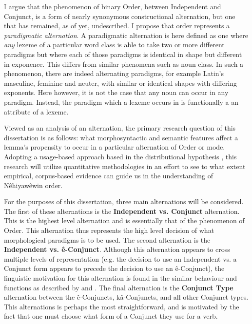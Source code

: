 I argue that the phenomenon of binary Order, between Independent and Conjunct, is a form of nearly synonymous constructional alternation, but one that has remained, as of yet, undescribed. I propose that order represents a \textit{paradigmatic alternation}. A paradigmatic alternation is here defined as one where \textit{any} lexeme of a particular word class is able to take two or more different paradigms but where each of those paradigms is identical in shape but different in exponence. This differs from similar phenomena such as noun class. In such a phenomenon, there are indeed alternating paradigms, for example Latin's masculine, feminine and neuter, with similar or identical shapes with differing exponents. Here however, it is not the case that any noun can occur in any paradigm. Instead, the paradigm which a lexeme occurs in is functionally a an attribute of a lexeme.

Viewed as an analysis of an alternation, the primary research question of this dissertation is as follows: what morphosyntactic and semantic features affect a lemma’s propensity to occur in a particular alternation of Order or mode. Adopting a usage-based approach based in the distributional hypothesis \citep{harris1954distributional, firth1957synopsis}, this research will utilize quantitative methodologies in an effort to see to what extent empirical, corpus-based evidence can guide us in the understanding of Nêhiyawêwin order.

For the purposes of this dissertation, three main alternations will be considered. The first of these alternations is the \textbf{Independent vs. Conjunct} alternation. This is the highest level alternation and is essentially that of the phenomenon of Order. This alternation thus represents the high level decision of what morphological paradigms is to be used. The second alternation is the \textbf{Independent vs. ê-Conjunct}. Although this alternation appears to cross multiple levels of representation (e.g. the decision to use an Independent vs. a Conjunct form appears to precede  the decision to use an ê-Conjunct), the linguistic motivation for this alternation is found in the similar behaviour and functions as described by \citet{Wolfart1973} and \citet{Cook2014}. The final alternation is the \textbf{Conjunct Type} alternation between the ê-Conjuncts, kâ-Conjuncts, and all other Conjunct types. This alternations is perhaps the most straightforward, and is motivated by the fact that one must choose what form of a Conjunct they use for a verb.  